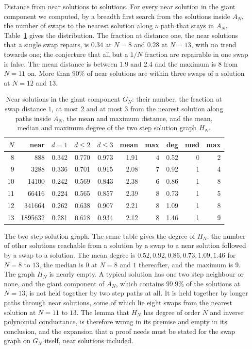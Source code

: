 Distance from near solutions to solutions. For every near solution in the giant component we computed, by a breadth first search from the solutions inside $A_N$, the number of swaps to the nearest solution along a path that stays in $A_N$. Table~\ref{tab:neardist} gives the distribution. The fraction at distance one, the near solutions that a single swap repairs, is $0.34$ at $N = 8$ and $0.28$ at $N = 13$, with no trend towards one; the conjecture that all but a $1/N$ fraction are repairable in one swap is false. The mean distance is between $1.9$ and $2.4$ and the maximum is $8$ from $N = 11$ on. More than $90\%$ of near solutions are within three swaps of a solution at $N = 12$ and $13$.

\begin{table}[t]
\centering
\footnotesize
\caption{Near solutions in the giant component $G_N$: their number, the fraction at swap distance $1$, at most $2$ and at most $3$ from the nearest solution along paths inside $A_N$, the mean and maximum distance, and the mean, median and maximum degree of the two step solution graph $H_N$.}
\label{tab:neardist}
\begin{tabular}{rrrrrrrrrr}
\toprule
$N$ & near & $d{=}1$ & $d{\le}2$ & $d{\le}3$ & mean & max & deg & med & max \\
\midrule
8 & 888 & 0.342 & 0.770 & 0.973 & 1.91 & 4 & 0.52 & 0 & 2 \\
9 & 3288 & 0.336 & 0.701 & 0.915 & 2.08 & 7 & 0.92 & 1 & 4 \\
10 & 14100 & 0.242 & 0.569 & 0.843 & 2.38 & 6 & 0.86 & 1 & 8 \\
11 & 66416 & 0.224 & 0.565 & 0.857 & 2.39 & 8 & 0.73 & 1 & 5 \\
12 & 341664 & 0.262 & 0.638 & 0.907 & 2.21 & 8 & 1.09 & 1 & 8 \\
13 & 1895632 & 0.281 & 0.678 & 0.934 & 2.12 & 8 & 1.46 & 1 & 9 \\
\bottomrule
\end{tabular}
\end{table}

The two step solution graph. The same table gives the degree of $H_N$: the number of other solutions reachable from a solution by a swap to a near solution followed by a swap to a solution. The mean degree is $0.52, 0.92, 0.86, 0.73, 1.09, 1.46$ for $N = 8$ to $13$, the median is $0$ at $N = 8$ and $1$ thereafter, and the maximum is $9$. The graph $H_N$ is nearly empty. A typical solution has one two step neighbour or none, and the giant component of $A_N$, which contains $99.9\%$ of the solutions at $N = 13$, is not held together by two step paths at all. It is held together by longer paths through near solutions, some of which lie eight swaps from the nearest solution at $N = 11$ to $13$. The lemma that $H_N$ has degree of order $N$ and inverse polynomial conductance, is therefore wrong in its premise and empty in its conclusion, and the expansion that a proof needs must be stated for the swap graph on $G_N$ itself, near solutions included.

